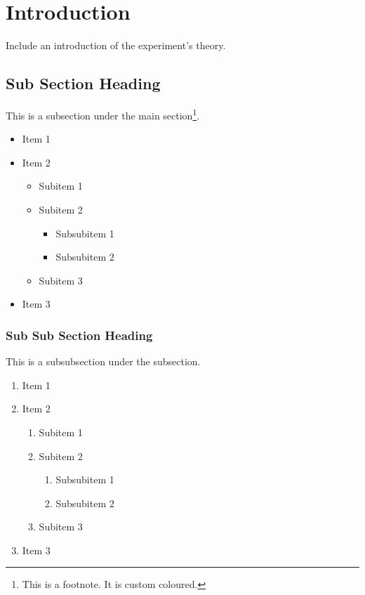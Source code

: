 \section{Introduction}

Include an introduction of the experiment's theory.

\subsection{Sub Section Heading}
This is a subsection under the main section\footnote{This is a footnote. It is custom coloured.}.
\begin{itemize}
    \item Item 1
    \item Item 2
    \begin{itemize}
        \item Subitem 1
        \item Subitem 2
        \begin{itemize}
            \item Subsubitem 1
            \item Subsubitem 2
        \end{itemize}
        \item Subitem 3
    \end{itemize}
    \item Item 3
\end{itemize}

\subsubsection{Sub Sub Section Heading}
This is a subsubsection under the subsection.
\begin{enumerate}
    \item Item 1
    \item Item 2
    \begin{enumerate}
        \item Subitem 1
        \item Subitem 2
        \begin{enumerate}
            \item Subsubitem 1
            \item Subsubitem 2
        \end{enumerate}
        \item Subitem 3
    \end{enumerate}
    \item Item 3
\end{enumerate}


\newpage